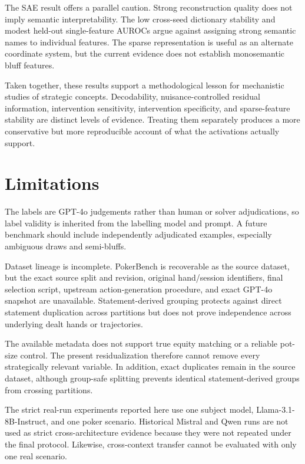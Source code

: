 The SAE result offers a parallel caution. Strong reconstruction quality does not imply semantic interpretability. The low cross-seed dictionary stability and modest held-out single-feature AUROCs argue against assigning strong semantic names to individual features. The sparse representation is useful as an alternate coordinate system, but the current evidence does not establish monosemantic bluff features.

Taken together, these results support a methodological lesson for mechanistic studies of strategic concepts. Decodability, nuisance-controlled residual information, intervention sensitivity, intervention specificity, and sparse-feature stability are distinct levels of evidence. Treating them separately produces a more conservative but more reproducible account of what the activations actually support.

\section{Limitations}
The labels are GPT-4o judgements rather than human or solver adjudications, so label validity is inherited from the labelling model and prompt. A future benchmark should include independently adjudicated examples, especially ambiguous draws and semi-bluffs.

Dataset lineage is incomplete. PokerBench is recoverable as the source dataset, but the exact source split and revision, original hand/session identifiers, final selection script, upstream action-generation procedure, and exact GPT-4o snapshot are unavailable. Statement-derived grouping protects against direct statement duplication across partitions but does not prove independence across underlying dealt hands or trajectories.

The available metadata does not support true equity matching or a reliable pot-size control. The present residualization therefore cannot remove every strategically relevant variable. In addition, exact duplicates remain in the source dataset, although group-safe splitting prevents identical statement-derived groups from crossing partitions.

The strict real-run experiments reported here use one subject model, Llama-3.1-8B-Instruct, and one poker scenario. Historical Mistral and Qwen runs are not used as strict cross-architecture evidence because they were not repeated under the final protocol. Likewise, cross-context transfer cannot be evaluated with only one real scenario.


